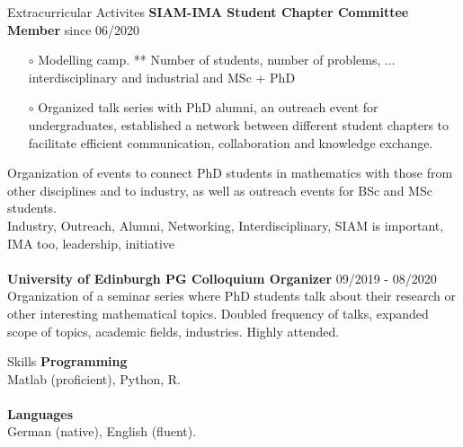 \documentclass{resume} %
\begin{document}
\begin{rSection}{Extracurricular Activites}
{\bf SIAM-IMA Student Chapter Committee Member} \hfill{since 06/2020}
\begin{itemize}
	\item[$\circ$] Modelling camp. ** Number of students, number of problems, ... interdisciplinary and industrial and MSc + PhD
	\item[$\circ$] Organized talk series with PhD alumni, an outreach event for undergraduates, established a network between different student chapters to facilitate efficient communication, collaboration and knowledge exchange. 
\end{itemize}
Organization of events to connect PhD students in mathematics with those from other disciplines and to industry, as well as outreach events for BSc and MSc students.\\
Industry, Outreach, Alumni, Networking, Interdisciplinary, SIAM is important, IMA too, leadership, initiative
\\
\\
{\bf University of Edinburgh PG Colloquium Organizer} \hfill{09/2019 - 08/2020}\\
Organization of a seminar series where PhD students talk about their research or other interesting mathematical topics. Doubled frequency of talks, expanded scope of topics, academic fields, industries. Highly attended.
\end{rSection}

\begin{rSection}{Skills}
	{\bf Programming}\\
	Matlab (proficient), Python, R.\\
	\\
	{\bf Languages}\\
	German (native), English (fluent). 
\end{rSection}
\end{document}
